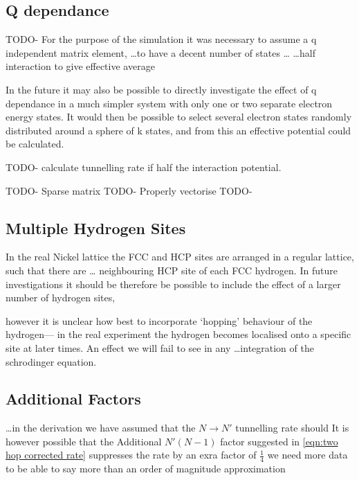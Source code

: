 \subsection{Q dependance}
TODO-
For the purpose of the simulation
it was necessary to assume a q independent
matrix element, \ldots to have a decent number of states \ldots
\ldots half interaction to give effective average

In the future it may also be possible to
directly investigate the effect
of q dependance in a much simpler system
with only one or two separate electron
energy states.
It would then be possible to select
several electron states randomly distributed
around a sphere of k states, and from
this an effective potential could be calculated.

TODO- calculate tunnelling rate if half the
interaction potential.

TODO- Sparse matrix
TODO- Properly vectorise
TODO-

\subsection{Multiple Hydrogen Sites}
In the real Nickel lattice the FCC and
HCP sites are arranged in a regular
lattice, such that there are \ldots
neighbouring HCP site of each FCC
hydrogen. In future investigations
it should be therefore be
possible to include the
effect of a larger number of
hydrogen sites,

however
it is unclear how best to
incorporate `hopping' behaviour
of the hydrogen--- in the real
experiment the hydrogen becomes
localised onto a specific site
at later times. An effect we will
fail to see in any \ldots integration of
the schrodinger equation.

\subsection{Additional Factors}
\ldots in the derivation we have assumed
that the \(N \rightarrow N' \)
tunnelling rate should
It is however possible that the
Additional \(N'(N-1)\) factor
suggested in \cref{eqn:two hop corrected rate}
suppresses the rate by an exra
factor of \(\frac{1}{4}\)
we need more data to be able to say more than
an order of magnitude approximation